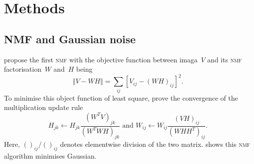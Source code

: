 \section{Methods \label{chapter2}}
\subsection{NMF and Gaussian noise}
\citet{lee2001algorithms} propose the first \textsc{nmf} with the objective function between imaga~$V$ and its \textsc{nmf} factorisation~$W$ and~$H$ being
\begin{equation*}
  \left\Vert V-WH \right\Vert= \sum_{ij} \left[V_{ij}-(WH)_{ij}\right]^2.
\end{equation*}
To minimise this object function of least square, \citet{lee2001algorithms} prove the convergence of the multiplication update rule
\begin{equation*}
H_{jk}\leftarrow H_{jk}\frac{(W^{T}V)_{jk}}{(W^{T}WH)_{jk}} \text{ and } W_{ij}\leftarrow W_{ij}\frac{(VH)_{ij}}{(WHH^{T})_{ij}}.
\end{equation*}
Here, $()_{ij}/()_{ij}$ denotes elementwise division of the two matrix. \citet{liu2015performance} shows this \textsc{nmf} algorithm minimises Gaussian.

